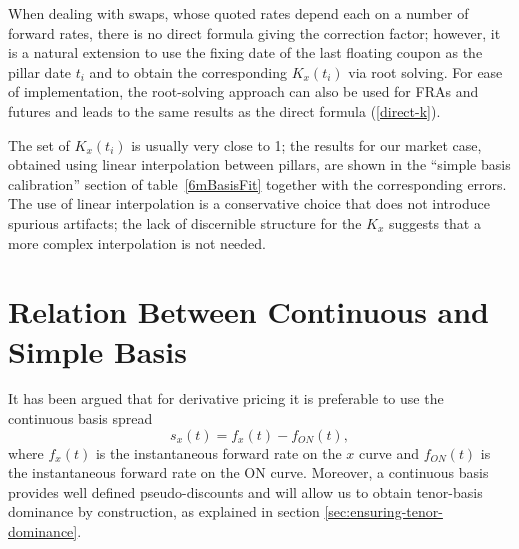 \documentclass{article}
\begin{document}
When dealing with swaps, whose quoted rates depend each on a number of forward rates, there is no direct formula giving the correction factor; however, it is a natural extension to use the fixing date of the last floating coupon as the pillar date $t_i$ and to obtain the corresponding $K_x(t_i)$ via root solving. For ease of implementation, the root-solving approach can also be used for FRAs and futures and leads to the same results as the direct formula (\ref{direct-k}).

The set of $K_x(t_i)$ is usually very close to 1; the results for our market case, obtained using linear interpolation between pillars, are shown in the ``simple basis calibration'' section of table~\ref{6mBasisFit} together with the corresponding errors.  The use of linear interpolation is a conservative choice that does not introduce spurious artifacts; the lack of discernible structure for the $K_x$ suggests that a more complex interpolation is not needed.













\section{Relation Between Continuous and Simple Basis}


It has been argued \cite{schlenkrich-miemiec} that  for derivative pricing it is preferable to use the continuous basis spread
\begin{equation}
\label{eq:s_x}
s_x(t) = f_x(t) - f_{ON}(t),
\end{equation}
where $f_x(t)$ is the instantaneous forward rate on the $x$ curve and $f_{ON}(t)$ is the instantaneous forward rate on the ON curve. Moreover, a continuous basis provides well defined pseudo-discounts and will allow us to obtain tenor-basis dominance by construction, as explained in section \ref{sec:ensuring-tenor-dominance}.
\end{document}
